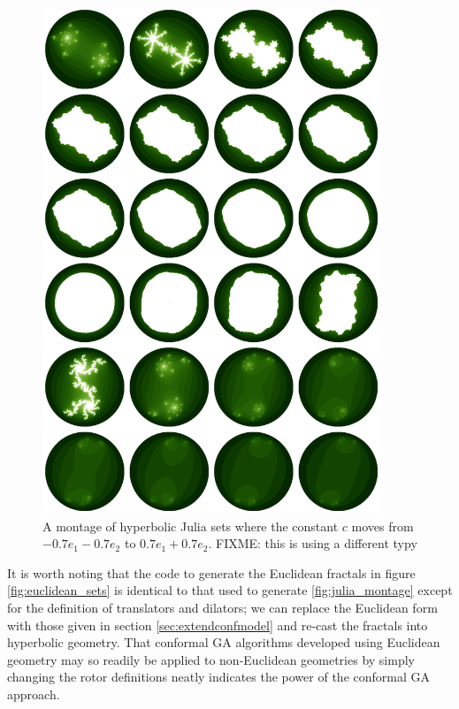 \begin{figure}[p]
\centering
\includegraphics[width=0.9\textwidth]{direct_julia_noneuclid}
\caption{\label{fig:direct_julia_noneuclid} 
  A montage of hyperbolic Julia sets where the constant $c$ moves from $-0.7e_1 - 0.7e_2$
  to $0.7e_1 + 0.7e_2$. FIXME: this is using a different typy
}
\end{figure}

It is worth noting that the code to generate the Euclidean fractals in figure 
\ref{fig:euclidean_sets} is identical to that used to generate
\ref{fig:julia_montage} except for the definition of translators and dilators;
we can replace the Euclidean form with those given in section
\ref{sec:extendconfmodel} and re-cast the fractals into hyperbolic geometry.
That conformal GA algorithms developed using Euclidean geometry may so readily
be applied to non-Euclidean geometries by simply changing the rotor
definitions neatly indicates the power of the conformal GA approach.



